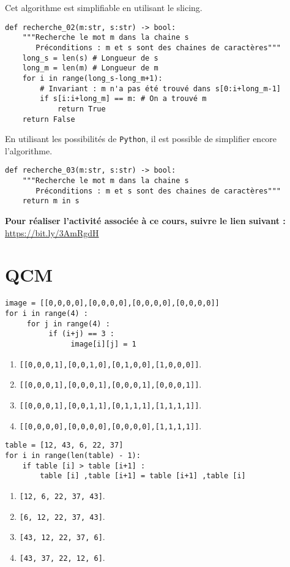 Cet algorithme est simplifiable en utilisant le slicing.
\begin{lstlisting}
def recherche_02(m:str, s:str) -> bool:
    """Recherche le mot m dans la chaine s
       Préconditions : m et s sont des chaines de caractères"""
    long_s = len(s) # Longueur de s
    long_m = len(m) # Longueur de m
    for i in range(long_s-long_m+1): 
        # Invariant : m n'a pas été trouvé dans s[0:i+long_m-1]
        if s[i:i+long_m] == m: # On a trouvé m
            return True
    return False
\end{lstlisting}

En utilisant les possibilités de \texttt{Python}, il est possible de simplifier encore l'algorithme. 

\begin{lstlisting}
def recherche_03(m:str, s:str) -> bool:
    """Recherche le mot m dans la chaine s
       Préconditions : m et s sont des chaines de caractères"""
    return m in s
\end{lstlisting}




\textbf{Pour réaliser l'activité associée à ce cours, suivre le lien suivant : }
\url{https://bit.ly/3AmRgdH}

\newpage
\section*{QCM}


\begin{lstlisting}
image = [[0,0,0,0],[0,0,0,0],[0,0,0,0],[0,0,0,0]]
for i in range(4) :
     for j in range(4) :
          if (i+j) == 3 :
               image[i][j] = 1
\end{lstlisting}
\begin{enumerate}
\item \texttt{[[0,0,0,1],[0,0,1,0],[0,1,0,0],[1,0,0,0]]}. %
\item \texttt{[[0,0,0,1],[0,0,0,1],[0,0,0,1],[0,0,0,1]]}.
\item \texttt{[[0,0,0,1],[0,0,1,1],[0,1,1,1],[1,1,1,1]]}.
\item \texttt{[[0,0,0,0],[0,0,0,0],[0,0,0,0],[1,1,1,1]]}.
\end{enumerate}


\begin{lstlisting}
table = [12, 43, 6, 22, 37]
for i in range(len(table) - 1):
    if table [i] > table [i+1] :
        table [i] ,table [i+1] = table [i+1] ,table [i]
\end{lstlisting}
\begin{enumerate}
\item \texttt{[12, 6, 22, 37, 43]}. %
\item \texttt{[6, 12, 22, 37, 43]}.
\item \texttt{[43, 12, 22, 37, 6]}.
\item \texttt{[43, 37, 22, 12, 6]}.
\end{enumerate}


